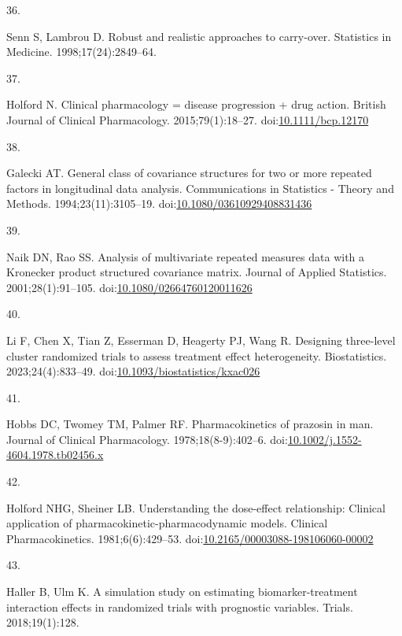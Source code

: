 \documentclass[
  11pt,
]{article}
\newlength{\cslhangindent}
\newlength{\csllabelwidth}
\newenvironment{CSLReferences}[2] %
 {\begin{list}{}{%
  \setlength{\itemindent}{0pt}
  \setlength{\leftmargin}{0pt}
  \setlength{\parsep}{0pt}
  \ifodd #1
   \setlength{\leftmargin}{\cslhangindent}
   \setlength{\itemindent}{-1\cslhangindent}
  \fi
  \setlength{\itemsep}{#2\baselineskip}}}
 {\end{list}}
\newcommand{\CSLLeftMargin}[1]{\parbox[t]{\csllabelwidth}{\strut#1\strut}}
\newcommand{\CSLRightInline}[1]{\parbox[t]{\linewidth - \csllabelwidth}{\strut#1\strut}}
\begin{document}
\begin{CSLReferences}{0}{1}
\CSLLeftMargin{36. }%
\CSLRightInline{Senn S, Lambrou D. Robust and realistic approaches to carry-over. Statistics in Medicine. 1998;17(24):2849--64.}

\CSLLeftMargin{37. }%
\CSLRightInline{Holford N. Clinical pharmacology = disease progression + drug action. British Journal of Clinical Pharmacology. 2015;79(1):18--27. doi:\href{https://doi.org/10.1111/bcp.12170}{10.1111/bcp.12170}}

\CSLLeftMargin{38. }%
\CSLRightInline{Galecki AT. General class of covariance structures for two or more repeated factors in longitudinal data analysis. Communications in Statistics - Theory and Methods. 1994;23(11):3105--19. doi:\href{https://doi.org/10.1080/03610929408831436}{10.1080/03610929408831436}}

\CSLLeftMargin{39. }%
\CSLRightInline{Naik DN, Rao SS. Analysis of multivariate repeated measures data with a {Kronecker} product structured covariance matrix. Journal of Applied Statistics. 2001;28(1):91--105. doi:\href{https://doi.org/10.1080/02664760120011626}{10.1080/02664760120011626}}

\CSLLeftMargin{40. }%
\CSLRightInline{Li F, Chen X, Tian Z, Esserman D, Heagerty PJ, Wang R. Designing three-level cluster randomized trials to assess treatment effect heterogeneity. Biostatistics. 2023;24(4):833--49. doi:\href{https://doi.org/10.1093/biostatistics/kxac026}{10.1093/biostatistics/kxac026}}

\CSLLeftMargin{41. }%
\CSLRightInline{Hobbs DC, Twomey TM, Palmer RF. Pharmacokinetics of prazosin in man. Journal of Clinical Pharmacology. 1978;18(8-9):402--6. doi:\href{https://doi.org/10.1002/j.1552-4604.1978.tb02456.x}{10.1002/j.1552-4604.1978.tb02456.x}}

\CSLLeftMargin{42. }%
\CSLRightInline{Holford NHG, Sheiner LB. Understanding the dose-effect relationship: Clinical application of pharmacokinetic-pharmacodynamic models. Clinical Pharmacokinetics. 1981;6(6):429--53. doi:\href{https://doi.org/10.2165/00003088-198106060-00002}{10.2165/00003088-198106060-00002}}

\CSLLeftMargin{43. }%
\CSLRightInline{Haller B, Ulm K. A simulation study on estimating biomarker-treatment interaction effects in randomized trials with prognostic variables. Trials. 2018;19(1):128.}


\end{CSLReferences}
\end{document}

